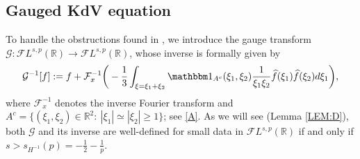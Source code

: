 \documentclass[%
11pt,  reqno]{amsart}
\newcommand{\5}{\textup{V}}
\newcommand{\FL}{\mathcal{F} L}
\newcommand{\ft}{\widehat}
\newcommand{\ind}{\mathbbm 1}
\theoremstyle{remark}
\newcommand{\R}{\mathbb{R}}
\newcommand{\Ft}{{\mathcal{F}}}
\newcommand{\Gc}{\mathcal{G}}
\numberwithin{equation}{section}
\numberwithin{theorem}{section}
\begin{document}
	
	



\subsection{Gauged KdV equation}


To handle the obstructions found in \cite{Grunrock_ldv_hier}, we introduce the gauge transform $\Gc:\FL^{s,p}(\R) \to \FL^{s,p}(\R)$, whose inverse is formally given by 
    \begin{equation}
\label{gauge}
\Gc^{-1}[f] 
:= f + \Ft_x^{-1}\bigg( - \frac{1}{3} \int_{\xi=\xi_1+\xi_2} \ind_{A^c}(\xi_1,\xi_2) \frac{1}{\xi_1\xi_2} \ft{f}(\xi_1) \ft{f}(\xi_2) d\xi_1 \bigg), 
    \end{equation}
    where $\Ft^{-1}_x$ denotes the inverse Fourier transform and $A^c = \{(\xi_1,\xi_2) \in \R^2: \ |\xi_1| \simeq |\xi_2| \ge 1\}$; see \eqref{A}.  As we will see (Lemma \ref{LEM:D}), both $\Gc$ and its inverse are well-defined for small data in $\FL^{s,p}(\R)$ if and only if $s>s_{H^{-1}}(p)=-\frac12-\frac1p$. 
    
\end{document}

